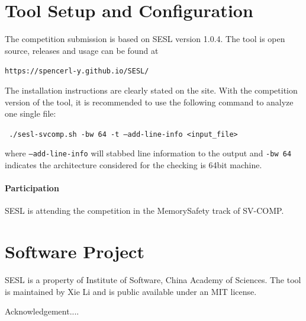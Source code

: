 \documentclass[runningheads]{llncs}
\begin{document}
\section{Tool Setup and Configuration}

The competition submission is based on \textsc{SESL} version 1.0.4. The tool is open source, releases and usage can be found at 
\begin{center}

\texttt{https://spencerl-y.github.io/SESL/}
\end{center}

The installation instructions are clearly stated on the site. With the competition version of the tool, it is recommended to use the following command to analyze one single file:

\begin{center}

\texttt{
./sesl-svcomp.sh -bw 64 -t --add-line-info <input\_file>}
\end{center}

where \texttt{--add-line-info} will stabbed line information to the output and \texttt{-bw 64} indicates the architecture considered for the checking is 64bit machine.
\paragraph{Participation} \textsc{SESL} is attending the competition in the MemorySafety track of SV-COMP.


\section{Software Project}

\textsc{SESL} is a property of Institute of Software, China Academy of Sciences. The tool is maintained by Xie Li and is public available under an MIT license. 

Acknowledgement....



%
%
%


\end{document}
